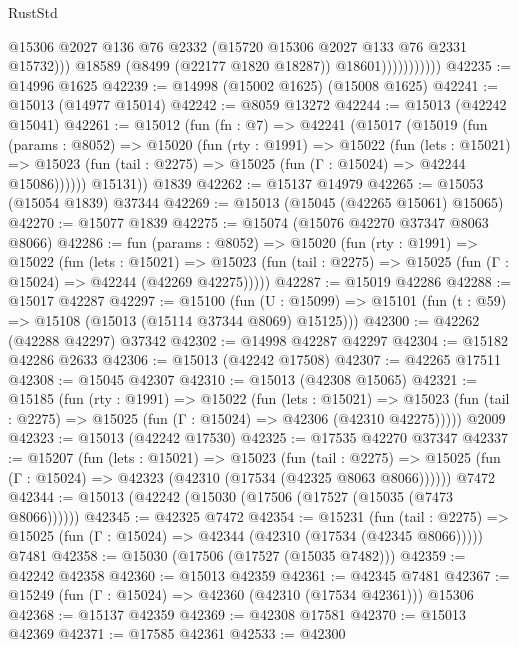 \begin{lexlean}{RustStd}
\begin{coremodule}
                              @15306
                              @2027
                              @136
                              @76
                              @2332
                              (@15720 @15306 @2027 @133 @76 @2331 @15732)))
                          @18589
                          (@8499 (@22177 @1820 @18287))
                          @18601)))))))))))
@42235 := @14996 @1625
@42239 := @14998 (@15002 @1625) (@15008 @1625)
@42241 := @15013 (@14977 @15014)
@42242 := @8059 @13272
@42244 := @15013 (@42242 @15041)
@42261 := @15012
    (fun (fn : @7) =>
    @42241
      (@15017
        (@15019
          (fun (params : @8052) =>
          @15020
            (fun (rty : @1991) =>
            @15022
              (fun (lets : @15021) =>
              @15023 (fun (tail : @2275) => @15025 (fun (Γ : @15024) => @42244 @15086))))))
        @15131))
    @1839
@42262 := @15137 @14979
@42265 := @15053 (@15054 @1839) @37344
@42269 := @15013 (@15045 (@42265 @15061) @15065)
@42270 := @15077 @1839
@42275 := @15074 (@15076 @42270 @37347 @8063 @8066)
@42286 := fun (params : @8052) =>
  @15020
    (fun (rty : @1991) =>
    @15022
      (fun (lets : @15021) =>
      @15023 (fun (tail : @2275) => @15025 (fun (Γ : @15024) => @42244 (@42269 @42275)))))
@42287 := @15019 @42286
@42288 := @15017 @42287
@42297 := @15100
    (fun (U : @15099) => @15101 (fun (t : @59) => @15108 (@15013 (@15114 @37344 @8069) @15125)))
@42300 := @42262 (@42288 @42297) @37342
@42302 := @14998 @42287 @42297
@42304 := @15182 @42286 @2633
@42306 := @15013 (@42242 @17508)
@42307 := @42265 @17511
@42308 := @15045 @42307
@42310 := @15013 (@42308 @15065)
@42321 := @15185
    (fun (rty : @1991) =>
    @15022
      (fun (lets : @15021) =>
      @15023 (fun (tail : @2275) => @15025 (fun (Γ : @15024) => @42306 (@42310 @42275)))))
    @2009
@42323 := @15013 (@42242 @17530)
@42325 := @17535 @42270 @37347
@42337 := @15207
    (fun (lets : @15021) =>
    @15023
      (fun (tail : @2275) =>
      @15025 (fun (Γ : @15024) => @42323 (@42310 (@17534 (@42325 @8063 @8066))))))
    @7472
@42344 := @15013 (@42242 (@15030 (@17506 (@17527 (@15035 (@7473 @8066))))))
@42345 := @42325 @7472
@42354 := @15231
    (fun (tail : @2275) => @15025 (fun (Γ : @15024) => @42344 (@42310 (@17534 (@42345 @8066)))))
    @7481
@42358 := @15030 (@17506 (@17527 (@15035 @7482)))
@42359 := @42242 @42358
@42360 := @15013 @42359
@42361 := @42345 @7481
@42367 := @15249 (fun (Γ : @15024) => @42360 (@42310 (@17534 @42361))) @15306
@42368 := @15137 @42359
@42369 := @42308 @17581
@42370 := @15013 @42369
@42371 := @17585 @42361
@42533 := @42300

\end{coremodule}
\end{lexlean}
